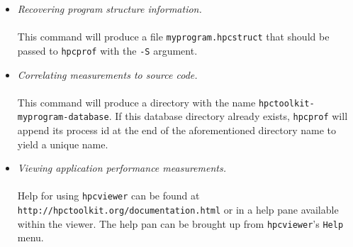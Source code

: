 \documentclass[10pt]{article}
\begin{document}
\begin{itemize}
For a sequential or multithreaded code:\\
\\[1ex]
For an MPI code:\\
\footnote{Here, we assume that your MPI launcher is named {\tt mpiexec}. It may be {\tt mpirun} or something else depending on the MPI implementation you are using.}\\[1ex]
\sloppy This command will produce a directory with the name {\tt hpctoolkit-myprogram-measurements}. If an {\tt hpcrun} command is run under control of PBS or GridEngine batch job schedulers, the name of the measurements directory will have its batch job id appended. For single-threaded programs, this directory will contain a single file with the suffix {\tt myprogram-{\em nodeid}.hpcrun}. {\em Nodeid} is a hex value representing the host name for the node on which the measurements were collected. For parallel codes, performance measurements will be saved in files within the measurements directory with names that have the MPI rank (0 if none) and the thread id embedded.
\item{ \em Recovering program structure information.}\\
\\[1ex]
This command will produce a file {\tt myprogram.hpcstruct} that should be passed to {\tt hpcprof} with the {\tt -S} argument.
\item{ \em Correlating measurements to source code.}\\
\\[1ex]
This command will produce a directory with the name {\tt hpctoolkit-myprogram-database}. If this database directory already exists, {\tt hpcprof} will append its process id at the end of the aforementioned directory name to yield a unique name.
\item{ \em Viewing application performance measurements.}\\
\\[1ex]
Help for using {\tt hpcviewer} can be found at  {\tt http://hpctoolkit.org/documentation.html}  or in a help pane available within the viewer. The help pan can be brought up from {\tt hpcviewer}'s {\tt Help} menu.

\end{itemize}
\end{document}
